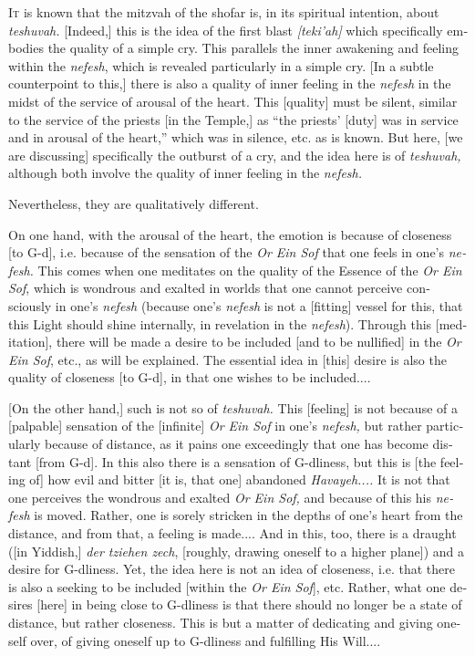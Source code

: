 \documentclass[10pt]{book}
\begin{document}
\begin{english}
    \leftskip=0pt \rightskip=0pt
\noindent \lettrine{I}{t} is known that the mitzvah of the shofar is, in its spiritual intention, about \emph{teshuvah.} [Indeed,] this is the idea of the first blast \emph{[teki'ah]} which specifically embodies the quality of a simple cry. This parallels the inner awakening and feeling within the \emph{nefesh}, which is revealed particularly in a simple cry. [In a subtle counterpoint to this,] there is also a quality of inner feeling in the \emph{nefesh} in the midst of the service of arousal of the heart. This [quality] must be silent, similar to the service of the priests [in the Temple,] as ``the priests' [duty] was in service and in arousal of the heart,'' which was in silence, etc. as is known. But here, [we are discussing] specifically the outburst of a cry, and the idea here is of \emph{teshuvah,} although both involve the quality of inner feeling in the \emph{nefesh.} 

Nevertheless, they are qualitatively different. 

On one hand, with the arousal of the heart, the emotion is because of closeness [to \mbox{G-d}], i.e. because of the sensation of the \emph{Or Ein Sof} that one feels in one's \emph{nefesh.} This comes when one meditates on the quality of the Essence of the \emph{Or Ein Sof}, which is wondrous and exalted in worlds that one cannot perceive consciously in one's \emph{nefesh} (because one's \emph{nefesh} is not a [fitting] vessel for this, that this Light should shine internally, in revelation in the \emph{nefesh}). Through this [meditation], there will be made a desire to be included [and to be nullified] in the \emph{Or Ein Sof}, etc., as will be explained. The essential idea in [this] desire is also the quality of closeness [to \mbox{G-d}], in that one wishes to be included....

[On the other hand,] such is not so of \emph{teshuvah.} This [feeling] is not because of a [palpable] sensation of the [infinite] \emph{Or Ein Sof} in one's \emph{nefesh,} but rather particularly because of distance, as it pains one exceedingly that one has become distant [from \mbox{G-d}]. In this also there is a sensation of \mbox{G-dliness}, but this is [the feeling of] how evil and bitter [it is, that one] abandoned \emph{Havayeh....} It is not that one perceives the wondrous and exalted \emph{Or Ein Sof,} and because of this his \emph{nefesh} is moved. Rather, one is sorely stricken in the depths of one's heart from the distance, and from that, a feeling is made.... And in this, too, there is a draught ([in Yiddish,] \emph{der tziehen zech}, [roughly, drawing oneself to a higher plane]) and a desire for \mbox{G-dliness.} Yet, the idea here is not an idea of closeness, i.e. that there is also a seeking to be included [within the \emph{Or Ein Sof}], etc. Rather, what one desires [here] in being close to \mbox{G-dliness} is that there should no longer be a state of distance, but rather closeness. This is but a matter of dedicating and giving oneself over, of giving oneself up to \mbox{G-dliness} and fulfilling His Will....

\end{english}
\end{document}
